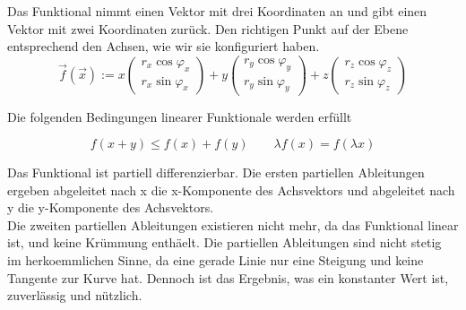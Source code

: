 \documentclass[a4paper]{article}
\begin{document}

Das Funktional nimmt einen Vektor mit drei Koordinaten an und gibt einen Vektor mit zwei Koordinaten zur\"uck. 
Den richtigen Punkt auf der Ebene entsprechend den Achsen, wie wir sie konfiguriert haben.\\

\begin{displaymath}
\vec{f}(\vec{x}) := x \begin{pmatrix}r_x \cos \varphi_x\\r_x \sin \varphi_x\end{pmatrix} +y  \begin{pmatrix}r_y \cos \varphi_y\\r_y \sin \varphi_y\end{pmatrix} +z  \begin{pmatrix}r_z \cos \varphi_z\\r_z \sin \varphi_z\end{pmatrix}
\end{displaymath}

Die folgenden Bedingungen linearer Funktionale werden erf\"ullt

\begin{displaymath}
    f(x + y) \leq f(x) + f(y)\qquad\lambda f(x) = f(\lambda x)
\end{displaymath}

Das Funktional ist partiell differenzierbar. Die ersten partiellen Ableitungen ergeben abgeleitet nach x die x-Komponente  des Achsvektors und abgeleitet nach y die y-Komponente des Achsvektors.\\

Die zweiten partiellen Ableitungen existieren nicht mehr, da das Funktional linear ist, und keine Kr\"ummung enth\"aelt. Die partiellen Ableitungen sind nicht stetig im herkoemmlichen Sinne, da eine gerade Linie nur eine Steigung und keine Tangente zur Kurve hat. Dennoch ist das Ergebnis, was ein konstanter Wert ist, zuverl\"assig und n\"utzlich. 
\end{document}
